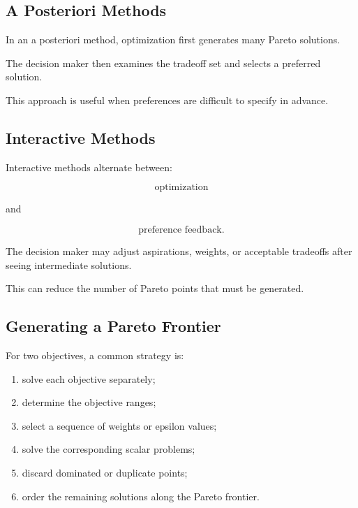 \subsection{A Posteriori Methods}
\label{subsec:a-posteriori-multiobjective}

In an a posteriori method, optimization first generates many Pareto
solutions.

The decision maker then examines the tradeoff set and selects a preferred
solution.

This approach is useful when preferences are difficult to specify in
advance.

\subsection{Interactive Methods}
\label{subsec:interactive-multiobjective}

Interactive methods alternate between:

\[
\boxed{
\text{optimization}
}
\]

and

\[
\boxed{
\text{preference feedback}.
}
\]

The decision maker may adjust aspirations, weights, or acceptable
tradeoffs after seeing intermediate solutions.

This can reduce the number of Pareto points that must be generated.

\subsection{Generating a Pareto Frontier}
\label{subsec:generating-pareto-frontier}

For two objectives, a common strategy is:

\begin{enumerate}
    \item solve each objective separately;
    \item determine the objective ranges;
    \item select a sequence of weights or epsilon values;
    \item solve the corresponding scalar problems;
    \item discard dominated or duplicate points;
    \item order the remaining solutions along the Pareto frontier.
\end{enumerate}

